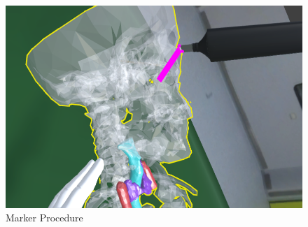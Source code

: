 \begin{figure}[ht!]
    \centering
    \includegraphics[width=\linewidth]{images/implementation/features/procedures/marker.png}
    \caption{\label{fig::FeatureDrilling} Marker Procedure}
\end{figure}
